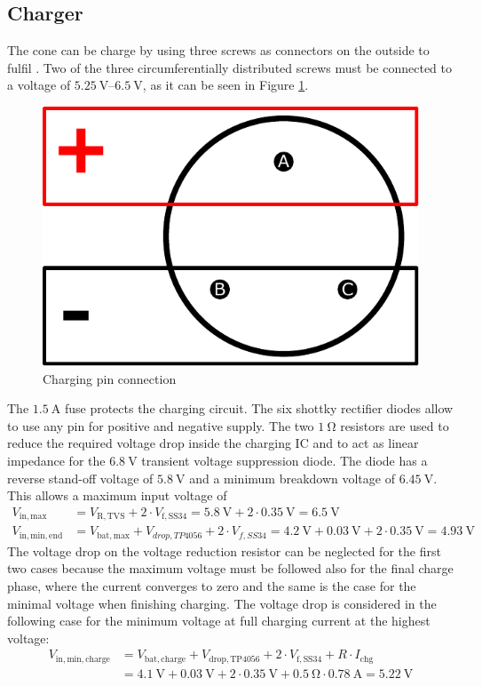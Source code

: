 \subsection{Charger}
\label{sec_charger}

The cone can be charge by using three screws as connectors on the outside to fulfil . Two of the three circumferentially distributed screws must be connected to a voltage of $\qtyrange{5.25}{6.5}{\V}$, as it can be seen in Figure \ref{fig_chg_connection}. 
\begin{figure}[h!]
	\centering
	\includegraphics[scale=0.5]{img/CAD_Charging.pdf}
	\caption{Charging pin connection}
	\label{fig_chg_connection}
\end{figure}
The $\qty{1.5}{\A}$ fuse protects the charging circuit. The six shottky rectifier diodes allow to use any pin for positive and negative supply. The two $\qty{1}{\ohm}$ resistors are used to reduce the required voltage drop inside the charging IC and to act as linear impedance for the $\qty{6.8}{\V}$ transient voltage suppression diode. The diode has a reverse stand-off voltage of $\qty{5.8}{\V}$ and a minimum breakdown voltage of $\qty{6.45}{\V}$. 
This allows a maximum input voltage of 
\begin{align}
	V_\mathrm{in,max} &= V_\mathrm{R,TVS} + 2\cdot V_\mathrm{f,SS34} = \qty{5.8}{\V}+ 2\cdot \qty{0.35}{\V}=\qty{6.5}{\V}\\
	V_\mathrm{in,min,end} &= V_\mathrm{bat,max} + V_{drop, TP4056} + 2\cdot V_{f,SS34} = \qty{4.2}{\V} + \qty{0.03}{\V} + 2\cdot \qty{0.35}{\V} = \qty{4.93}{\V}
\end{align}
The voltage drop on the voltage reduction resistor can be neglected for the first two cases because the maximum voltage must be followed also for the final charge phase, where the current converges to zero and the same is the case for the minimal voltage when finishing charging. 
The voltage drop is considered in the following case for the minimum voltage at full charging current at the highest voltage:
\begin{align}
	V_\mathrm{in,min,charge} &= V_\mathrm{bat,charge} + V_\mathrm{drop, TP4056} + 2\cdot V_\mathrm{f,SS34} + R \cdot I_\mathrm{chg}\\
	&= \qty{4.1}{\V} + \qty{0.03}{\V} + 2\cdot \qty{0.35}{\V} + \qty{0.5}{\ohm} \cdot  \qty{0.78}{\A} = \qty{5.22}{\V}
\end{align}

